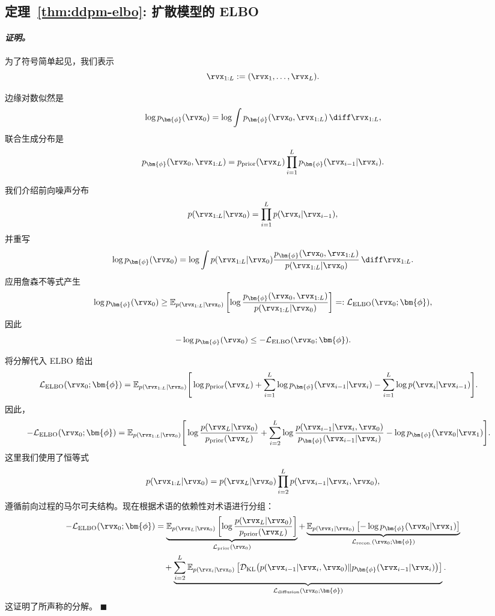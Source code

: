 \subsection{定理~\ref{thm:ddpm-elbo}: 扩散模型的 ELBO}\label{app:vlb-proof}

\paragraph{\textit{证明。}} 为了符号简单起见，我们表示
\[
\rvx_{1:L}:=(\rvx_1,\ldots,\rvx_L).
\]

边缘对数似然是
\[
\log p_{\bm{\phi}}(\rvx_0)
=
\log \int p_{\bm{\phi}}(\rvx_0,\rvx_{1:L})\,\diff \rvx_{1:L},
\]
联合生成分布是
\[
p_{\bm{\phi}}(\rvx_0,\rvx_{1:L})
=
p_{\text{prior}}(\rvx_L)\prod_{i=1}^L p_{\bm{\phi}}(\rvx_{i-1}| \rvx_i).
\]

我们介绍前向噪声分布
\[
p(\rvx_{1:L}| \rvx_0)
=
\prod_{i=1}^L p(\rvx_i| \rvx_{i-1}),
\]
并重写
\[
\log p_{\bm{\phi}}(\rvx_0)
=
\log \int
p(\rvx_{1:L}| \rvx_0)
\frac{p_{\bm{\phi}}(\rvx_0,\rvx_{1:L})}{p(\rvx_{1:L}| \rvx_0)}
\,\diff \rvx_{1:L}.
\]
应用詹森不等式产生
\[
\log p_{\bm{\phi}}(\rvx_0)
\ge
\mathbb{E}_{p(\rvx_{1:L}| \rvx_0)}
\left[
\log
\frac{p_{\bm{\phi}}(\rvx_0,\rvx_{1:L})}{p(\rvx_{1:L}| \rvx_0)}
\right]
=: \mathcal{L}_{\text{ELBO}}(\rvx_0;\bm{\phi}),
\]
因此
\[
-\log p_{\bm{\phi}}(\rvx_0)
\le
-\mathcal{L}_{\text{ELBO}}(\rvx_0;\bm{\phi}).
\]

将分解代入 ELBO 给出
\begin{align*}
\mathcal{L}_{\text{ELBO}}(\rvx_0;\bm{\phi})
&=
\mathbb{E}_{p(\rvx_{1:L}| \rvx_0)}
\Bigg[
\log p_{\text{prior}}(\rvx_L)
+
\sum_{i=1}^L \log p_{\bm{\phi}}(\rvx_{i-1}| \rvx_i)
-
\sum_{i=1}^L \log p(\rvx_i| \rvx_{i-1})
\Bigg].
\end{align*}
因此，
\begin{align*}
-\mathcal{L}_{\text{ELBO}}(\rvx_0;\bm{\phi})
&=
\mathbb{E}_{p(\rvx_{1:L}| \rvx_0)}
\Bigg[
\log \frac{p(\rvx_L| \rvx_0)}{p_{\text{prior}}(\rvx_L)}
+
\sum_{i=2}^L
\log \frac{p(\rvx_{i-1}| \rvx_i,\rvx_0)}{p_{\bm{\phi}}(\rvx_{i-1}| \rvx_i)}
-
\log p_{\bm{\phi}}(\rvx_0| \rvx_1)
\Bigg].
\end{align*}
这里我们使用了恒等式
\[
p(\rvx_{1:L}| \rvx_0)
=
p(\rvx_L| \rvx_0)\prod_{i=2}^L p(\rvx_{i-1}| \rvx_i,\rvx_0),
\]
遵循前向过程的马尔可夫结构。现在根据术语的依赖性对术语进行分组：
\begin{align*}
-\mathcal{L}_{\text{ELBO}}(\rvx_0;\bm{\phi})
&=
\underbrace{
\mathbb{E}_{p(\rvx_L| \rvx_0)}
\left[
\log \frac{p(\rvx_L| \rvx_0)}{p_{\text{prior}}(\rvx_L)}
\right]
}_{\mathcal{L}_{\text{prior}}(\rvx_0)}
+
\underbrace{
\mathbb{E}_{p(\rvx_1| \rvx_0)}
\left[
-\log p_{\bm{\phi}}(\rvx_0| \rvx_1)
\right]
}_{\mathcal{L}_{\text{recon.}}(\rvx_0;\bm{\phi})}
\\
&\quad+
\underbrace{
\sum_{i=2}^L
\mathbb{E}_{p(\rvx_i| \rvx_0)}
\left[
\mathcal{D}_{\mathrm{KL}}
\big(
p(\rvx_{i-1}| \rvx_i,\rvx_0)
\|
p_{\bm{\phi}}(\rvx_{i-1}| \rvx_i)
\big)
\right]
}_{\mathcal{L}_{\text{diffusion}}(\rvx_0;\bm{\phi})}.
\end{align*}
这证明了所声称的分解。
\hfill$\blacksquare$


